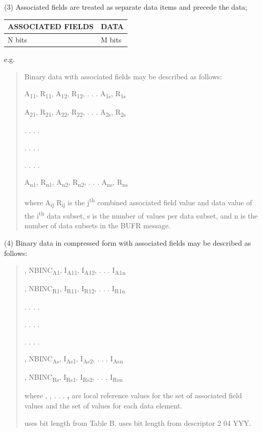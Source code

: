(3) Associated fields are treated as separate data items and precede the data;

\begin{longtable}[]{@{}ll@{}}
\toprule
ASSOCIATED FIELDS & DATA\tabularnewline
\midrule
\endhead
N bits & M bits\tabularnewline
\bottomrule
\end{longtable}

e.g.

\begin{quote}
Binary data with associated fields may be described as follows:

A\textsubscript{11}, R\textsubscript{11}, A\textsubscript{12}, R\textsubscript{12}, . . . A\textsubscript{1s}, R\textsubscript{1s}

A\textsubscript{21}, R\textsubscript{21}, A\textsubscript{22}, R\textsubscript{22}, . . . A\textsubscript{2s}, R\textsubscript{2s}

. . . .

. . . .

. . . .

A\textsubscript{n1}, R\textsubscript{n1}, A\textsubscript{n2}, R\textsubscript{n2}, . . . A\textsubscript{ns}, R\textsubscript{ns}

where A\textsubscript{ij} R\textsubscript{ij} is the j\textsuperscript{th} combined associated field value and data value of the i\textsuperscript{th} data subset, s is the number of values per data subset, and n is the number of data subsets in the BUFR message.
\end{quote}

(4) Binary data in compressed form with associated fields may be described as follows:

\begin{quote}
, NBINC\textsubscript{A1}, I\textsubscript{A11}, I\textsubscript{A12}, . . . I\textsubscript{A1n}

, NBINC\textsubscript{R1}, I\textsubscript{R11}, I\textsubscript{R12}, . . . I\textsubscript{R1n}

. . . .

. . . .

. . . .

, NBINC\textsubscript{As}, I\textsubscript{As1}, I\textsubscript{As2}, . . . I\textsubscript{Asn}

, NBINC\textsubscript{Rs}, I\textsubscript{Rs1}, I\textsubscript{Rs2}, . . . I\textsubscript{Rsn}

where , , . . . \textbf{,} are local reference values for the set of associated field values and the set of values for each data element.

uses bit length from Table B. uses bit length from descriptor 2 04 YYY.
\end{quote}

